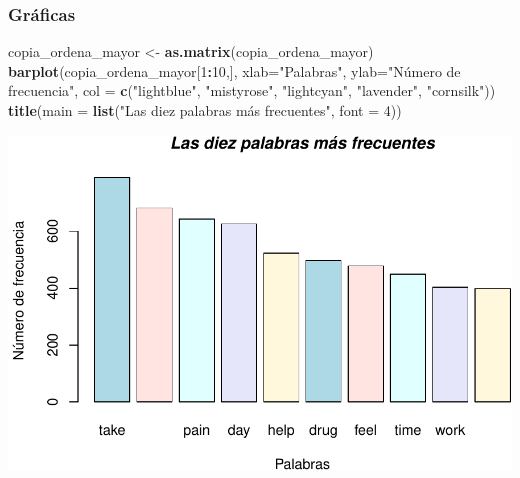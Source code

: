 \documentclass[spanish,]{article}
\newenvironment{Shaded}{\begin{snugshade}}{\end{snugshade}}
\newcommand{\DataTypeTok}[1]{\textcolor[rgb]{0.13,0.29,0.53}{#1}}
\newcommand{\DecValTok}[1]{\textcolor[rgb]{0.00,0.00,0.81}{#1}}
\newcommand{\KeywordTok}[1]{\textcolor[rgb]{0.13,0.29,0.53}{\textbf{#1}}}
\newcommand{\NormalTok}[1]{#1}
\newcommand{\OperatorTok}[1]{\textcolor[rgb]{0.81,0.36,0.00}{\textbf{#1}}}
\newcommand{\StringTok}[1]{\textcolor[rgb]{0.31,0.60,0.02}{#1}}
\begin{document}
\hypertarget{graficas}{%
\subsubsection{Gráficas}\label{graficas}}

\begin{Shaded}
\begin{Highlighting}[]
\NormalTok{copia_ordena_mayor <-}\StringTok{ }\KeywordTok{as.matrix}\NormalTok{(copia_ordena_mayor)}
\KeywordTok{barplot}\NormalTok{(copia_ordena_mayor[}\DecValTok{1}\OperatorTok{:}\DecValTok{10}\NormalTok{,],  }\DataTypeTok{xlab=}\StringTok{"Palabras"}\NormalTok{, }\DataTypeTok{ylab=}\StringTok{"Número de frecuencia"}\NormalTok{,}
        \DataTypeTok{col =} \KeywordTok{c}\NormalTok{(}\StringTok{"lightblue"}\NormalTok{, }\StringTok{"mistyrose"}\NormalTok{, }\StringTok{"lightcyan"}\NormalTok{,}
                \StringTok{"lavender"}\NormalTok{, }\StringTok{"cornsilk"}\NormalTok{))}
\KeywordTok{title}\NormalTok{(}\DataTypeTok{main =} \KeywordTok{list}\NormalTok{(}\StringTok{"Las diez palabras más frecuentes"}\NormalTok{, }\DataTypeTok{font =} \DecValTok{4}\NormalTok{))}
\end{Highlighting}
\end{Shaded}

\includegraphics{practica_files/figure-latex/unnamed-chunk-29-1.pdf}
\end{document}

